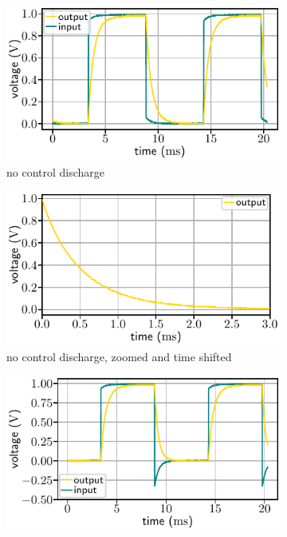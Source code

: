 \documentclass[10pt, a4paper]{article} %
\begin{document}
  \begin{figure}
     \centering
     \begin{subfigure}{0.495\textwidth}
	     \includegraphics[width=\textwidth]{lqr0_ana.pdf}
	     \caption{no control discharge}
     \end{subfigure}
	  \begin{subfigure}{0.495\textwidth}
	     \includegraphics[width=\textwidth]{lqr0_ana2.pdf}
		  \caption{no control discharge, zoomed and time shifted}
     \end{subfigure}
\begin{subfigure}{0.495\textwidth}
	     \includegraphics[width=\textwidth]{lqr1_ana.pdf}

\end{subfigure}
\end{figure}
\end{document}
